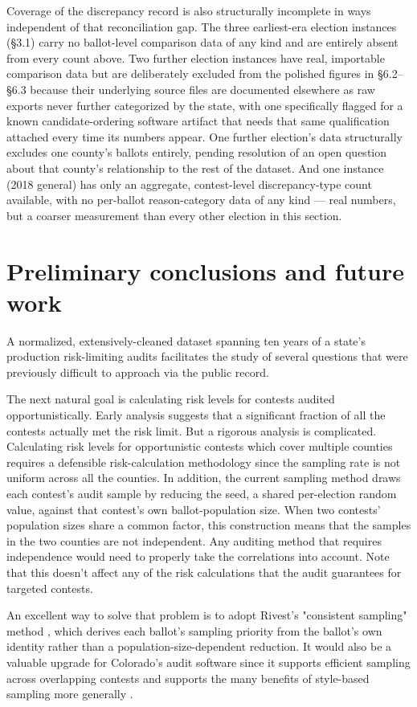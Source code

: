 Coverage of the discrepancy record is also structurally incomplete in
ways independent of that reconciliation gap. The three earliest-era
election instances (§3.1) carry no ballot-level comparison data of any
kind and are entirely absent from every count above. Two further election
instances have real, importable comparison data but are deliberately
excluded from the polished figures in §6.2–§6.3 because their underlying
source files are documented elsewhere as raw exports never further
categorized by the state, with one specifically flagged for a known
candidate-ordering software artifact that needs that same qualification
attached every time its numbers appear. One further election's data structurally excludes one county's
ballots entirely, pending resolution of an open question about that
county's relationship to the rest of the dataset. And one instance (2018
general) has only an aggregate, contest-level discrepancy-type count
available, with no per-ballot reason-category data of any kind — real
numbers, but a coarser measurement than every other election in this
section.

\section{Preliminary conclusions and future work}

A normalized, extensively-cleaned dataset spanning ten years of a
state's production risk-limiting audits facilitates the study
of several questions that were previously difficult to approach via the public record.

The next natural goal is calculating risk levels for contests audited opportunistically.
Early analysis suggests that a significant fraction of all the contests actually met
the risk limit. But a rigorous analysis is complicated.
Calculating risk levels for opportunistic contests which cover multiple counties requires a defensible
risk-calculation methodology since the sampling rate is not uniform across
all the counties.
In addition, the current sampling method draws each contest's
audit sample by reducing the seed, a shared per-election random value, against that
contest's own ballot-population size. When two contests' population sizes
share a common factor, this construction means that the samples in the
two counties are not independent. Any auditing method that requires
independence would need to properly take the correlations into account.
Note that this doesn't affect any of the risk calculations that the audit
guarantees for targeted contests.

An excellent way to solve that problem is to adopt Rivest's
"consistent sampling" method \cite{rivest2018consistent}, which derives
each ballot's sampling priority from the ballot's own identity rather than
a population-size-dependent reduction. It would also be a valuable
upgrade for Colorado's audit software since it
supports efficient sampling across overlapping contests and
supports the many benefits of style-based sampling more generally
\cite{glazer2021style}.
